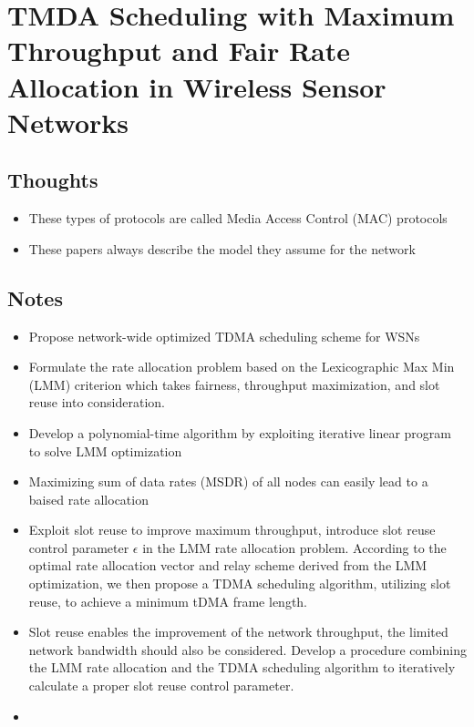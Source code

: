 \documentclass{article}
\begin{document}
\section{TMDA Scheduling with Maximum Throughput and Fair Rate Allocation in Wireless Sensor Networks}

\subsection{Thoughts}
\begin{itemize}
    \item These types of protocols are called Media Access Control (MAC) protocols
    \item These papers always describe the model they assume for the network
\end{itemize}

\subsection{Notes}
\begin{itemize}
    \item Propose network-wide optimized TDMA scheduling scheme for WSNs
    \item Formulate the rate allocation problem based on the Lexicographic Max Min (LMM) criterion which takes fairness, throughput maximization, and slot reuse into consideration.
    \item Develop a polynomial-time algorithm by exploiting iterative linear program to solve LMM optimization
    \item Maximizing sum of data rates (MSDR) of all nodes can easily lead to a baised rate allocation
    \item Exploit slot reuse to improve maximum throughput, introduce slot reuse control parameter $\epsilon$ in the LMM rate allocation problem.  According to the optimal rate allocation vector and relay scheme derived from the LMM optimization, we then propose a TDMA scheduling algorithm, utilizing slot reuse, to achieve a minimum tDMA frame length.
    \item Slot reuse enables the improvement of the network throughput, the limited network bandwidth should also be considered.  Develop a procedure combining the LMM rate allocation and the TDMA scheduling algorithm to iteratively calculate a proper slot reuse control parameter.
    \item
\end{itemize}
\end{document}

